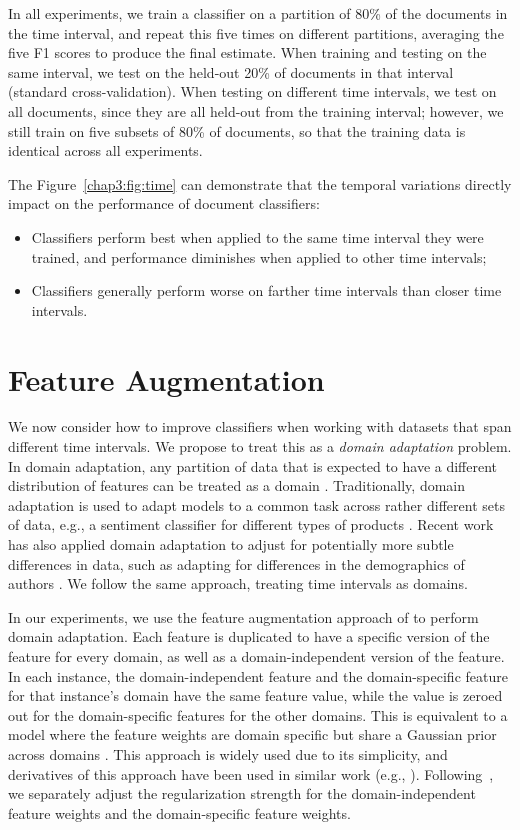 In all experiments, we train a classifier on a partition of 80\% of the documents in the time interval, and repeat this five times on different partitions, averaging the five F1 scores to produce the final estimate. When training and testing on the same interval, we test on the held-out 20\% of documents in that interval (standard cross-validation).
When testing on different time intervals, we test on all documents, since they are all held-out from the training interval; however, we still train on five subsets of 80\% of documents, so that the training data is identical across all experiments.

The Figure~\ref{chap3:fig:time} can demonstrate that the temporal variations directly impact on the performance of document classifiers: 
\begin{itemize}
    \item Classifiers perform best when applied to the same time interval they were trained, and performance diminishes when applied to other time intervals;
    \item Classifiers generally perform worse on farther time intervals than closer time intervals.
\end{itemize}


\section{Feature Augmentation}
\label{chap3:sec:fa}

We now consider how to improve classifiers when working with datasets that span different time intervals.
We propose to treat this as a {\em domain adaptation} problem.
In domain adaptation, any partition of data that is expected to have a different distribution of features can be treated as a domain \cite{joshi2013s}.
Traditionally, domain adaptation is used to adapt models to a common task across rather different sets of data, e.g., a sentiment classifier for different types of products \cite{blitzer-07}.
Recent work has also applied domain adaptation to adjust for potentially more subtle differences in data, such as adapting for differences in the demographics of authors \cite{volkova2013exploring, lynn2017human}.
We follow the same approach, treating time intervals as domains.

In our experiments, we use the feature augmentation approach of \cite{daume2007frustratingly} to perform domain adaptation. Each feature is duplicated to have a specific version of the feature for every domain, as well as a domain-independent version of the feature. In each instance, the domain-independent feature and the domain-specific feature for that instance's domain have the same feature value, while the value is zeroed out for the domain-specific features for the other domains. This is equivalent to a model where the feature weights are domain specific but share a Gaussian prior across domains \cite{Finkel09}.
This approach is widely used due to its simplicity, and derivatives of this approach have been used in similar work (e.g., \cite{lynn2017human}).
Following~\cite{Finkel09}, we separately adjust the regularization strength for the domain-independent feature weights and the domain-specific feature weights.


